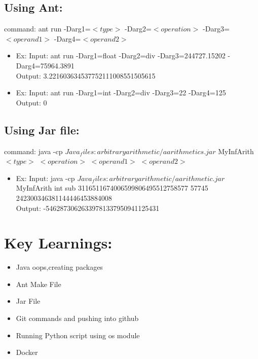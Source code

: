 \documentclass{article}
\begin{document}
\subsection*{Using Ant:}
command: ant run -Darg1=$<type>$ -Darg2=$<operation>$ -Darg3=$<operand1>$ -Darg4=$<operand2>$
\begin{itemize}
    \item Ex: Input: ant run -Darg1=float -Darg2=div -Darg3=244727.15202 -Darg4=75964.3891  \\
    Output: 3.221603634537752111008551505615
    \item Ex: Input: ant run -Darg1=int -Darg2=div -Darg3=22 -Darg4=125\\
    Output: 0
\end{itemize}
\subsection*{Using Jar file:}
command: java -cp $Java_files:arbitraryarithmetic/aarithmetics.jar$ MyInfArith $<type>$ $<operation>$ $<operand1>$ $<operand2>$ 

\begin{itemize}
    


\item Ex: Input: java -cp $Java_files:arbitraryarithmetic/aarithmetic.jar$ 
 MyInfArith  int sub 3116511674006599806495512758577 57745
242300346381144446453884008\\
    Output: -54628730626339781337950941125431
    

\end{itemize}

\section*{Key Learnings:}

\begin{itemize}
    \item Java oops,creating packages
    \item Ant Make File
    \item Jar File
    \item Git commands and pushing into github
    \item Running Python script using os module 
    \item Docker 
\end{itemize}










  







    
\end{document}
